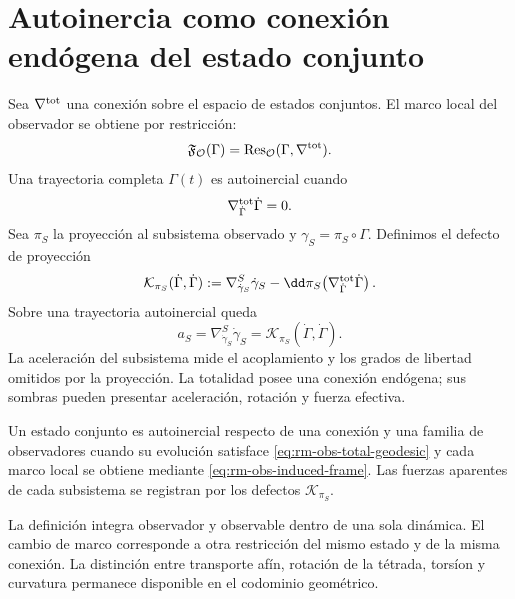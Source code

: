 \section{Autoinercia como conexi\'on end\'ogena del estado conjunto}

Sea \(\nabla^{\rm tot}\) una conexi\'on sobre el espacio de estados
conjuntos. El marco local del observador se obtiene por restricci\'on:
\begin{equation}
 \mathfrak F_{\mathcal O}(\Gamma)
 =\operatorname{Res}_{\mathcal O}
 (\Gamma,\nabla^{\rm tot}).
 \label{eq:rm-obs-induced-frame}
\end{equation}
Una trayectoria completa \(\Gamma(t)\) es autoinercial cuando
\begin{equation}
 \nabla^{\rm tot}_{\dot\Gamma}\dot\Gamma=0.
 \label{eq:rm-obs-total-geodesic}
\end{equation}
Sea \(\pi_S\) la proyecci\'on al subsistema observado y
\(\gamma_S=\pi_S\circ\Gamma\). Definimos el defecto de proyecci\'on
\begin{equation}
 \mathcal K_{\pi_S}(\dot\Gamma,\dot\Gamma)
 :=\nabla^S_{\dot\gamma_S}\dot\gamma_S
 -\dd\pi_S\!\left(
 \nabla^{\rm tot}_{\dot\Gamma}\dot\Gamma
 \right).
 \label{eq:rm-obs-projection-defect}
\end{equation}
Sobre una trayectoria autoinercial queda
\begin{equation}
 \boxed{
 a_S=\nabla^S_{\dot\gamma_S}\dot\gamma_S
 =\mathcal K_{\pi_S}(\dot\Gamma,\dot\Gamma).}
 \label{eq:rm-obs-projected-acceleration}
\end{equation}
La aceleraci\'on del subsistema mide el acoplamiento y los grados de libertad
omitidos por la proyecci\'on. La totalidad posee una conexi\'on end\'ogena;
sus sombras pueden presentar aceleraci\'on, rotaci\'on y fuerza efectiva.

\begin{definition}
Un estado conjunto es autoinercial respecto de una conexi\'on y una familia
de observadores cuando su evoluci\'on satisface
\cref{eq:rm-obs-total-geodesic} y cada marco local se obtiene mediante
\cref{eq:rm-obs-induced-frame}. Las fuerzas aparentes de cada subsistema se
registran por los defectos \(\mathcal K_{\pi_S}\).
\end{definition}

La definici\'on integra observador y observable dentro de una sola din\'amica.
El cambio de marco corresponde a otra restricci\'on del mismo estado y de la
misma conexi\'on. La distinci\'on entre transporte af\'in, rotaci\'on de la
t\'etrada, tors\'ion y curvatura permanece disponible en el codominio
geom\'etrico.


